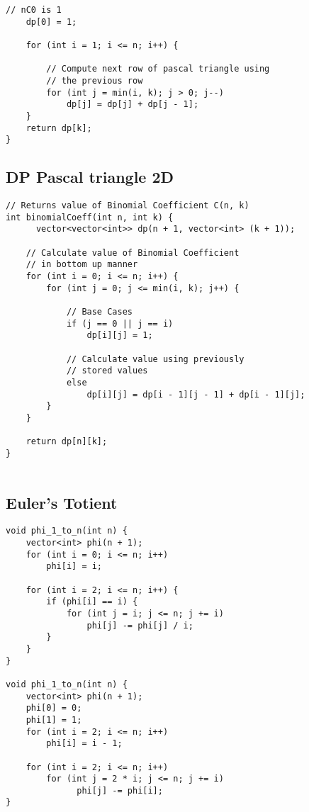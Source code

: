 \documentclass[10pt]{article}
\begin{document}
\begin{multicols*}{2}
\begin{lstlisting}[style=compactcpp]
      // nC0 is 1
    dp[0] = 1; 

    for (int i = 1; i <= n; i++) {
      
        // Compute next row of pascal triangle using
        // the previous row
        for (int j = min(i, k); j > 0; j--)
            dp[j] = dp[j] + dp[j - 1];
    }
    return dp[k];
}
\end{lstlisting}
\subsection{DP Pascal triangle 2D}
\begin{lstlisting}[style=compactcpp]
    // Returns value of Binomial Coefficient C(n, k)
int binomialCoeff(int n, int k) {
      vector<vector<int>> dp(n + 1, vector<int> (k + 1));
  
    // Calculate value of Binomial Coefficient
    // in bottom up manner
    for (int i = 0; i <= n; i++) {
        for (int j = 0; j <= min(i, k); j++) {
          
            // Base Cases
            if (j == 0 || j == i)
                dp[i][j] = 1;

            // Calculate value using previously
            // stored values
            else
                dp[i][j] = dp[i - 1][j - 1] + dp[i - 1][j];
        }
    }

    return dp[n][k];
}
    
\end{lstlisting}


\subsection{Euler's Totient}

\begin{lstlisting}[style=compactcpp]
void phi_1_to_n(int n) {
    vector<int> phi(n + 1);
    for (int i = 0; i <= n; i++)
        phi[i] = i;

    for (int i = 2; i <= n; i++) {
        if (phi[i] == i) {
            for (int j = i; j <= n; j += i)
                phi[j] -= phi[j] / i;
        }
    }
}

void phi_1_to_n(int n) {
    vector<int> phi(n + 1);
    phi[0] = 0;
    phi[1] = 1;
    for (int i = 2; i <= n; i++)
        phi[i] = i - 1;

    for (int i = 2; i <= n; i++)
        for (int j = 2 * i; j <= n; j += i)
              phi[j] -= phi[i];
}
\end{lstlisting}


\end{multicols*}
\end{document}
